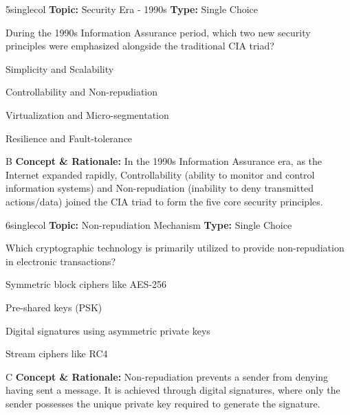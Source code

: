 \begin{qcard}{5}{singlecol}
\textcolor{darkslate!75}{\small\textbf{Topic:} Security Era - 1990s \hfill \textbf{Type:} Single Choice}\vspace{0.4em}\par
During the 1990s Information Assurance period, which two new security principles were emphasized alongside the traditional CIA triad?
\begin{qoptions}
\item Simplicity and Scalability
\item Controllability and Non-repudiation
\item Virtualization and Micro-segmentation
\item Resilience and Fault-tolerance
\end{qoptions}
\end{qcard}
\nopagebreak
\begin{explainbox}{B}
\textbf{Concept \& Rationale:} In the 1990s Information Assurance era, as the Internet expanded rapidly, Controllability (ability to monitor and control information systems) and Non-repudiation (inability to deny transmitted actions/data) joined the CIA triad to form the five core security principles.
\end{explainbox}

\begin{qcard}{6}{singlecol}
\textcolor{darkslate!75}{\small\textbf{Topic:} Non-repudiation Mechanism \hfill \textbf{Type:} Single Choice}\vspace{0.4em}\par
Which cryptographic technology is primarily utilized to provide non-repudiation in electronic transactions?
\begin{qoptions}
\item Symmetric block ciphers like AES-256
\item Pre-shared keys (PSK)
\item Digital signatures using asymmetric private keys
\item Stream ciphers like RC4
\end{qoptions}
\end{qcard}
\nopagebreak
\begin{explainbox}{C}
\textbf{Concept \& Rationale:} Non-repudiation prevents a sender from denying having sent a message. It is achieved through digital signatures, where only the sender possesses the unique private key required to generate the signature.
\end{explainbox}

